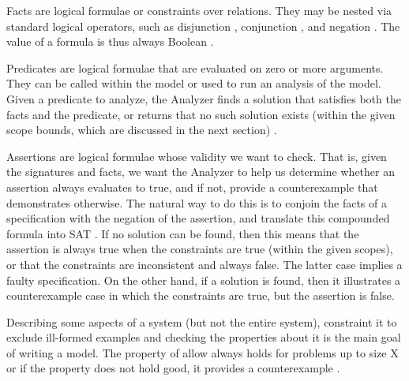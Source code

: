 \documentclass[a4paper,10pt]{report}
\begin{document}
Facts are logical formulae or constraints over relations. They may be nested via standard logical operators, such as disjunction , conjunction , and negation . The value of a formula is thus always Boolean \cite{Yeung2005}.

Predicates are logical formulae that are evaluated on zero or more arguments. They can be called within the model or used to run an analysis of the model. Given a predicate to analyze, the Analyzer finds a solution that satisfies both the facts and the predicate, or returns that no such solution exists (within the given scope bounds, which are discussed in the next section) \cite{Yeung2005}.

Assertions are logical formulae whose validity we want to check. That is, given the signatures and facts, we want the Analyzer to help us determine whether an assertion always evaluates to true, and if not, provide a counterexample that demonstrates otherwise. The natural way to do this is to conjoin the facts of a specification with the negation of the assertion, and translate this compounded formula into SAT \cite{Strichman}. If no solution can be found, then this means that the assertion is always true when the constraints are true (within the given scopes), or that the constraints are inconsistent and always false. The latter case implies a faulty specification. On the other hand, if a solution is found, then it illustrates a counterexample case in which the constraints are true, but the assertion is false. 

Describing some aspects of a system (but not the entire system), constraint it to exclude ill-formed examples and checking the properties about it is the main goal of writing a model. The property of allow always holds for problems up to size X or if the property does not hold good, it provides a counterexample \cite{Yeung2005}.
\end{document}
